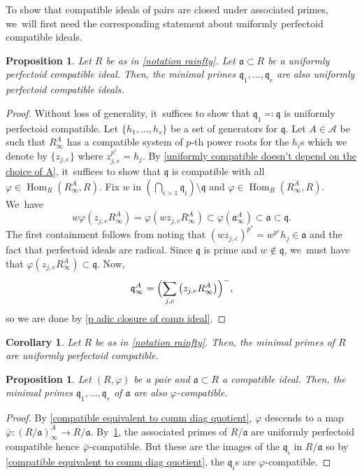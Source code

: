 \documentclass[11pt]{article}
\let\autoref\cref
\theoremstyle{plain}
\newtheorem{corollary}[theorem]{Corollary}
\newtheorem{proposition}[theorem]{Proposition}
\theoremstyle{definition}
\numberwithin{equation}{theorem}
\newcommand{\fra}{\mathfrak{a}}
\newcommand{\q}{\mathfrak{q}}
\DeclareMathOperator{\Hom}{Hom}
\newcommand{\sA}{\mathcal{A}}
\newcommand{\pe}{{p^e}}
\renewcommand{\phi}{\varphi}
\newcommand{\rphi}{(R,\phi)}
\newcommand{\rafty}{R^A_\infty}
\newcommand{\aafty}{\fra^A_\infty}
\begin{document}
To show that compatible ideals of pairs are closed under associated primes, we~will first need the corresponding statement about uniformly perfectoid compatible ideals.

\begin{proposition}\label{uniform compatible closed under ass primes}
Let $R$ be as in \autoref{notation rainfty}. Let $\fra\subset R$ be a uniformly perfectoid compatible ideal. Then, the minimal primes $\q_1,\ldots,\q_r$ are also uniformly perfectoid compatible ideals.
\end{proposition}

\begin{proof}
Without loss of generality, it~suffices to show that $\q_1\eqqcolon \q$ is uniformly perfectoid compatible. Let $\{h_1,\ldots,h_s\}$ be a set of generators for $\q$. Let $A\in \sA$ be such that $\rafty$ has a compatible system of $p$-th power roots for the $h_i$s which we denote by
$\{z_{j,e}\}$ where $z_{j,e}^\pe=h_j$.
By \autoref{uniformly compatible doesn't depend on the choice of A}, it~suffices to show that $\q$ is compatible with all $\phi\in \Hom_R(\rafty,R)$.
Fix $w$ in $(\bigcap_{i>1} \q_i)\setminus \q$ and $\phi\in \Hom_R(\rafty,R)$. We~have
\[
w\phi\left(z_{j,e} \rafty\right)=\phi\left(wz_{j,e} \rafty\right)\subset \phi\left(\aafty\right)\subset \fra \subset \q.
\]
The first containment follows from noting that $\left(wz_{j,e}\right)^\pe=w^{\pe}h_j \in \fra$ and the fact that perfectoid ideals are radical. Since $\q$ is prime and $w\notin \q$, we~must have that $\phi\left(z_{j,e}\rafty\right)\subset \q$. Now,\vspace*{-3pt}
\[
\q^A_\infty=\Bigl( \sum_{j,e} \left(z_{j,e}\rafty\right) \Bigr)^{-},
\]
so we are done by \autoref{p adic closure of comp ideal}.
\end{proof}

\begin{corollary}\label{ass primes of ring are uniformly compatible}
Let $R$ be as in \autoref{notation rainfty}. Then, the minimal primes of $R$ are uniformly perfectoid compatible.
\end{corollary}

\begin{proposition}\label{compatible ideals of pairs closed under ass primes}
Let $\rphi$ be a pair and $\fra\subset R$ a compatible ideal. Then, the minimal primes $\q_1,\ldots,\q_r$ of $\fra$ are also $\phi$-compatible.
\end{proposition}

\begin{proof}
By \autoref{compatible equivalent to comm diag quotient}, $\phi$ descends to a map $\bar{\phi}\colon (R/\fra)^A_\infty\to R/\fra$. By~\autoref{ass primes of ring are uniformly compatible}, the associated primes of $R/\fra$ are uniformly perfectoid compatible hence $\bar{\phi}$-compatible. But these are the images of the $\q_i$ in $R/\fra$ so by \autoref{compatible equivalent to comm diag quotient}, the $\q_i$s are $\phi$-compatible.
\end{proof}
\end{document}
